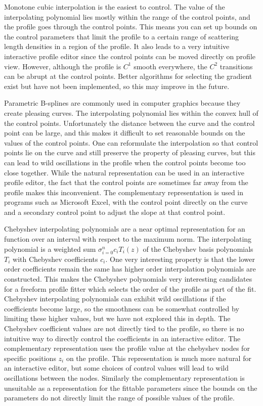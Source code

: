 \documentclass[letterpaper,10pt,english]{sphinxmanual}
\begin{document}
Monotone cubic interpolation is the easiest to control.  The value of the
interpolating polynomial lies mostly within the range of the control
points, and the profile goes through the control points.  This means
you can set up bounds on the control parameters that limit the profile
to a certain range of scattering length densities in a region of the
profile.  It also leads to a very intuitive interactive profile editor
since the control points can be moved directly on profile view.  However,
although the profile is $C^1$ smooth everywhere, the $C^2$ transitions
can be abrupt at the control points.  Better algorithms for selecting the
gradient exist but have not been implemented, so this may improve in
the future.

Parametric B-splines are commonly used in computer graphics because they
create pleasing curves.  The interpolating polynomial lies within the
convex hull of the control points.  Unfortunately the distance between the
curve and the control point can be large, and this makes it difficult
to set reasonable bounds on the values of the control points.  One can
reformulate the interpolation so that control points lie on the curve
and still preserve the property of pleasing curves, but this can lead
to wild oscillations in the profile when the control points become too
close together.  While the natural representation can be used in an
interactive profile editor, the fact that the control points are sometimes
far away from the profile makes this inconvenient.  The complementary
representation is used in programs such as Microsoft Excel, with the
control point directly on the curve and a secondary control point to
adjust the slope at that control point.

Chebyshev interpolating polynomials are a near optimal representation
for an function over an interval with respect to the maximum norm.  The
interpolating polynomial is a weighted sum $\sigma_{i=0}^n c_i T_i(z)$
of the Chebyshev basis polynomials $T_i$ with Chebyshev coefficients $c_i$.
One very interesting property is that the lower order coefficients remain
the same has higher order interpolation polynomials are constructed.
This makes the Chebyshev polynomials very interesting candidates for
a freeform profile fitter which selects the order of the profile as
part of the fit.  Chebyshev interpolating polynomials can exhibit
wild oscillations if the coefficients become large, so the smoothness
can be somewhat controlled by limiting these higher values, but we have
not explored this in depth. The Chebyshev coefficient values are not
directly tied to the profile, so there is no intuitive way to directly
control the coefficients in an interactive editor. The complementary
representation uses the profile value at the chebyshev nodes for
specific positions $z_i$ on the profile.  This representation is much
more natural for an interactive editor, but some choices of control
values will lead to wild oscillations between the nodes.  Similarly
the complementary representation is unsuitable as a representation
for the fittable parameters since the bounds on the parameters do
not directly limit the range of possible values of the profile.
\end{document}
